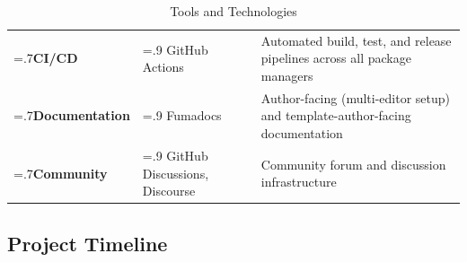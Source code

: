 \documentclass[a4paper,twoside]{article}
\begin{document}
\begin{table}[H]
\begin{tabularx}{\textwidth}{>{\raggedright\arraybackslash\hsize=.7\hsize}X >{\raggedright\arraybackslash\hsize=.9\hsize}X >{\raggedright\arraybackslash\hsize=1.4\hsize}X}
    \textbf{CI/CD}                 & GitHub Actions                      & Automated build, test, and release pipelines across all package managers \\
    \textbf{Documentation}         & Fumadocs                            & Author-facing (multi-editor setup) and template-author-facing documentation \\
    \textbf{Community}             & GitHub Discussions, Discourse       & Community forum and discussion infrastructure \\
    \bottomrule
  \end{tabularx}
  \caption{Tools and Technologies}
  \label{tab:tools}
\end{table}

\subsection{Project Timeline}
\end{document}
